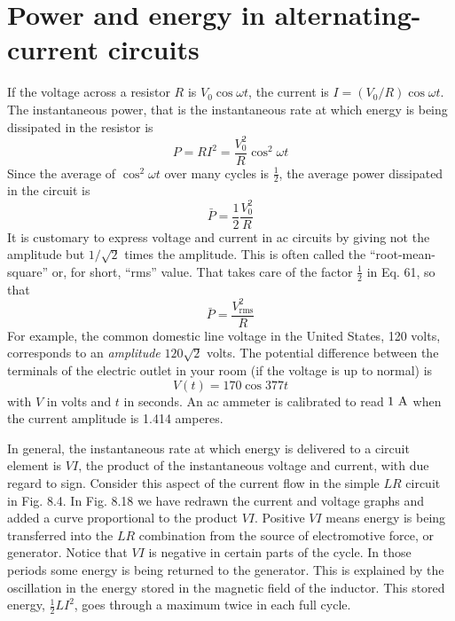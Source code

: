 \section{Power and energy in alternating-current circuits}
If the voltage across a resistor $R$ is $V_0 \cos \omega t$, the current is
$I = (V_0/R) \cos \omega t$. The instantaneous power, that is the instantaneous
rate at which energy is being dissipated in the resistor is
\begin{equation}
  P = RI^2 = \frac{V_0^2}{R}\cos^2\omega t
\end{equation}
Since the average of $\cos^2\omega t$ over many cycles is $\frac{1}{2}$, the average power
dissipated in the circuit is
\begin{equation}
  \bar{P} = \frac{1}{2}\frac{V_0^2}{R}
\end{equation}
It is customary to express voltage and current in ac circuits by giving
not the amplitude but $1/\sqrt{2}$ times the amplitude. This is often called
the ``root-mean-square'' or, for short, ``rms'' value.
That takes care
of the factor $\frac{1}{2}$ in Eq. 61, so that
\begin{equation}
  \bar{P} = \frac{V_\text{rms}^2}{R}
\end{equation}
For example, the common domestic line voltage in the United States, 120 volts, corresponds
to an \emph{amplitude} $120\sqrt{2}$ volts. The potential difference 
between the terminals of the electric outlet in your room (if the voltage
is up to normal) is
\begin{equation}
  V(t) = 170\cos 377t
\end{equation}
with $V$ in volts and $t$ in seconds. An ac ammeter is calibrated to read
$1\ \textup{A}$ when the current amplitude is 1.414 amperes.

In general, the instantaneous rate at which energy is delivered to
a circuit element is $VI$, the product of the instantaneous voltage and
current, with due regard to sign. Consider this aspect of the current
flow in the simple $LR$ circuit in Fig. 8.4. In Fig. 8.18 we have redrawn
the current and voltage graphs and added a curve proportional to
the product $VI$. Positive $VI$ means energy is being transferred into
the $LR$ combination from the source of electromotive force, or
generator. Notice that $VI$ is negative in certain parts of the cycle.
In those periods some energy is being returned to the generator.
This is explained by the oscillation in the energy stored in the magnetic
field of the inductor. This stored energy, $\frac{1}{2}LI^2$, goes through
a maximum twice in each full cycle.

